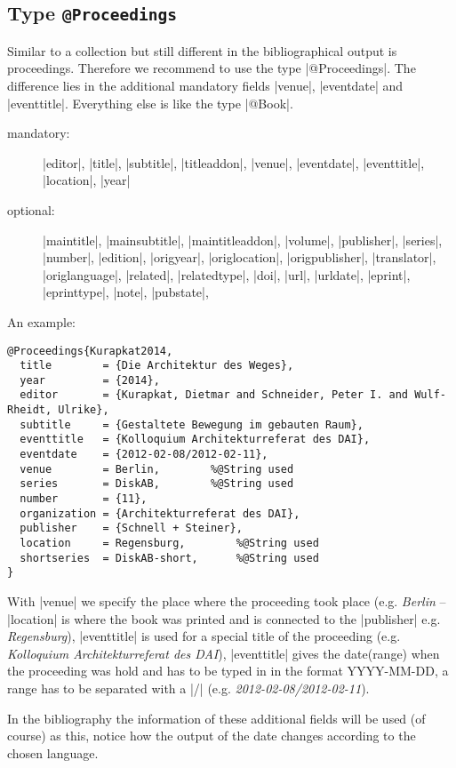 \documentclass[a4paper,
10pt,
greek,
french,
spanish,
italian,
ngerman,
english
]{ltxdoc}
\begin{document}
\subsection{Type \texttt{@Proceedings}}\label{proceedings}
Similar to a collection but still different in the bibliographical output is proceedings.
Therefore we recommend to use the type |@Proceedings|.
The difference lies in the additional mandatory fields |venue|, |eventdate| and |eventtitle|. Everything else is like the type |@Book|.

\begin{description}
\item[mandatory:] 
|editor|, 
|title|, |subtitle|, |titleaddon|,
|venue|, |eventdate|, |eventtitle|,
|location|, |year|
\item[optional:]
|maintitle|, |mainsubtitle|, |maintitleaddon|, |volume|, 
|publisher|, |series|, |number|, |edition|, 
|origyear|, |origlocation|, |origpublisher|, 
|translator|, |origlanguage|,
|related|, |relatedtype|,
|doi|, |url|, |urldate|, |eprint|, |eprinttype|, |note|, |pubstate|, 
 \end{description}
 
An example:
 \begin{lstlisting}[style=bibentry,label=Kurapkat2014,caption={{@}Proceedings\{Kurapkat2014,…\} }]
@Proceedings{Kurapkat2014,
  title        = {Die Architektur des Weges},
  year         = {2014},
  editor       = {Kurapkat, Dietmar and Schneider, Peter I. and Wulf-Rheidt, Ulrike},
  subtitle     = {Gestaltete Bewegung im gebauten Raum},
  eventtitle   = {Kolloquium Architekturreferat des DAI},
  eventdate    = {2012-02-08/2012-02-11},
  venue        = Berlin, 		%@String used
  series       = DiskAB,		%@String used
  number       = {11},
  organization = {Architekturreferat des DAI},
  publisher    = {Schnell + Steiner},
  location     = Regensburg, 		%@String used
  shortseries  = DiskAB-short,		%@String used
}
\end{lstlisting}
With |venue| we specify the place where the proceeding took place (e.g. \emph{Berlin} -- |location| is where the book was printed and is connected to the |publisher| e.g. \emph{Regensburg}),
|eventtitle| is used for a special title of the proceeding (e.g. \emph{Kolloquium Architekturreferat des DAI}),
|eventtitle| gives the date(range) when the proceeding was hold and has to be typed in in the format YYYY-MM-DD, a range has to be separated with a |/| (e.g.  \emph{2012-02-08/2012-02-11}).

In the bibliography the information of these additional fields will be used (of course) as this, notice how the output of the date changes according to the chosen language.
\end{document}
